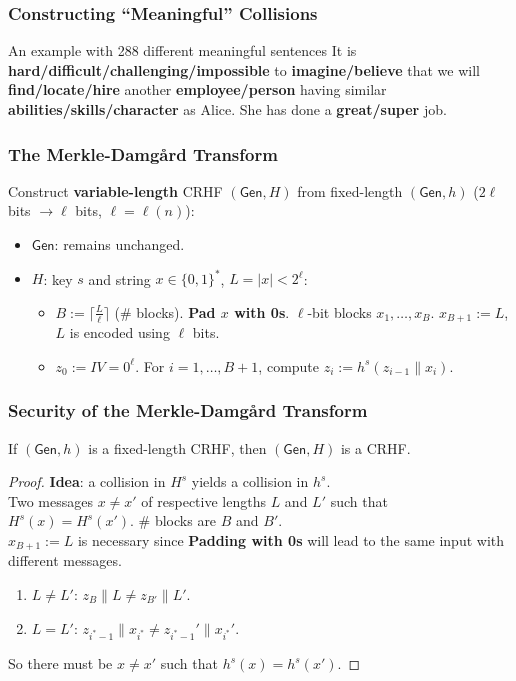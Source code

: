 \begin{frame}\frametitle{Constructing ``Meaningful'' Collisions}
\begin{exampleblock}{An example with 288 different meaningful sentences}
It is \textbf{hard/difficult/challenging/impossible} to \textbf{imagine/believe} that we will \textbf{find/locate/hire} another \textbf{employee/person} having similar \textbf{abilities/skills/character} as Alice. She has done a \textbf{great/super} job.
\end{exampleblock}
\end{frame}
\begin{frame}\frametitle{The Merkle-Damg\r{a}rd Transform}
\begin{figure}
\begin{center}

\end{center}
\end{figure}
\begin{construction}
Construct \textbf{variable-length} CRHF $(\mathsf{Gen}, H)$ from fixed-length $(\mathsf{Gen}, h)$ ($2\ell$ bits $\to \ell$ bits, $\ell = \ell(n)$):
\begin{itemize}
\item $\mathsf{Gen}$: remains unchanged.
\item $H$: key $s$ and string $x \in \{0,1\}^*$, $L=|x|< 2^{\ell}$:
\begin{itemize}
\item $B := \lceil \frac{L}{\ell} \rceil$ (\# blocks). \textbf{Pad $x$ with 0s}.  $\ell$-bit blocks $x_1,\dotsc,x_B$. $x_{B+1} := L$, $L$ is encoded using $\ell$ bits.
\item $z_0 := IV = 0^\ell$. For $i=1,\dotsc,B+1$, compute $z_i := h^s(z_{i-1}\| x_i)$.
\end{itemize}
\end{itemize}
\end{construction}
\end{frame}
\begin{frame}\frametitle{Security of the Merkle-Damg\r{a}rd Transform}
\begin{theorem}
If $(\mathsf{Gen},h)$ is a fixed-length CRHF, then $(\mathsf{Gen},H)$ is a CRHF.
\end{theorem}
\begin{proof}
\textbf{Idea}: a collision in $H^s$ yields a collision in $h^s$. \\
Two messages $x \ne x'$ of respective lengths $L$ and $L'$ such that $H^s(x) = H^s(x')$. \# blocks are $B$ and $B'$. \\
$x_{B+1} := L$ is necessary since \textbf{Padding with 0s} will lead to the same input with different messages.
\begin{enumerate}
\item $L \ne L'$: $z_B\| L \ne z_{B'}\| L'$.
\item $L = L'$: $z_{i^*-1}\| x_{i^*} \ne z_{i^*-1}'\| x_{i^*}'$.
\end{enumerate}
So there must be $x \neq x'$ such that $h^s(x) = h^s(x')$.
\end{proof}
\end{frame}

